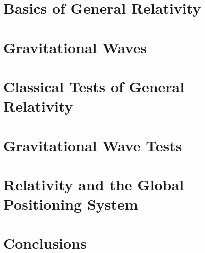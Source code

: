 \documentclass[a4paper,11pt,notitlepage,twoside]{report}
\begin{document}


\chapter{Basics of General Relativity}

\chapter{Gravitational Waves}

\chapter{Classical Tests of General Relativity}

\chapter{Gravitational Wave Tests}

\chapter{Relativity and the Global Positioning System}

\chapter{Conclusions}


\nocite{*}
{\thispagestyle{plain}
\printbibliography
}
\end{document}
